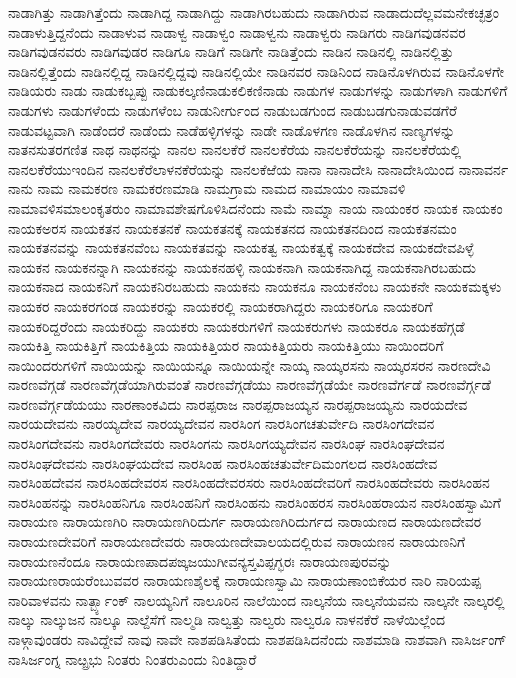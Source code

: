 {ನಾಡಾಗಿತ್ತು
ನಾಡಾಗಿತ್ತೆಂದು
ನಾಡಾಗಿದ್ದ
ನಾಡಾಗಿದ್ದು
ನಾಡಾಗಿರಬಹುದು
ನಾಡಾಗಿರುವ
ನಾಡಾದುದೆಲ್ಲವಮನೇಕಚ್ಛತ್ರಂ
ನಾಡಾಳುತ್ತಿದ್ದನೆಂದು
ನಾಡಾಳುವ
ನಾಡಾಳ್ವ
ನಾಡಾಳ್ವಂ
ನಾಡಾಳ್ವನು
ನಾಡಾಳ್ವರು
ನಾಡಿಗರು
ನಾಡಿಗವುಡನವರ
ನಾಡಿಗವುಡನವರು
ನಾಡಿಗವುಡರ
ನಾಡಿಗೂ
ನಾಡಿಗೆ
ನಾಡಿಗೇ
ನಾಡಿತ್ತೆಂದು
ನಾಡಿನ
ನಾಡಿನಲ್ಲಿ
ನಾಡಿನಲ್ಲಿತ್ತು
ನಾಡಿನಲ್ಲಿತ್ತೆಂದು
ನಾಡಿನಲ್ಲಿದ್ದ
ನಾಡಿನಲ್ಲಿದ್ದವು
ನಾಡಿನಲ್ಲಿಯೇ
ನಾಡಿನವರ
ನಾಡಿನಿಂದ
ನಾಡಿನೊಳಗಿರುವ
ನಾಡಿನೊಳಗೇ
ನಾಡಿಯರು
ನಾಡು
ನಾಡುಕಬ್ಬಪ್ಪು
ನಾಡುಕಲ್ಕಣಿನಾಡುಕಲಿಕಣಿನಾಡು
ನಾಡುಗಳ
ನಾಡುಗಳನ್ನು
ನಾಡುಗಳಾಗಿ
ನಾಡುಗಳಿಗೆ
ನಾಡುಗಳು
ನಾಡುಗಳೆಂದು
ನಾಡುಗಳೆಂಬ
ನಾಡುನೀರ್ಗುಂದ
ನಾಡುಬಡಗುಂದ
ನಾಡುಬಡಗುನಾಡುವಡಗೆರೆ
ನಾಡುವಟ್ಟವಾಗಿ
ನಾಡೆಂದರೆ
ನಾಡೆಂದು
ನಾಡೆಹಳ್ಳಿಗಳನ್ನು
ನಾಡೇ
ನಾಡೊಳಗಣ
ನಾಡೊಳಗಿನ
ನಾಣ್ಯಗಳನ್ನು
ನಾತನಸುತರಗಣಿತ
ನಾಥ
ನಾಥನನ್ನು
ನಾನಲ
ನಾನಲಕೆರೆ
ನಾನಲಕೆರೆಯ
ನಾನಲಕೆರೆಯನ್ನು
ನಾನಲಕೆರೆಯಲ್ಲಿ
ನಾನಲಕೆರೆಯುಇಂದಿನ
ನಾನಲಕೆರೆಲಾಳನಕೆರೆಯನ್ನು
ನಾನಲಕೆಱೆಯ
ನಾನಾ
ನಾನಾದೇಸಿ
ನಾನಾದೇಸಿಯಿಂದ
ನಾನಾವರ್ನ
ನಾನು
ನಾಮ
ನಾಮಕರಣ
ನಾಮಕರಣಮಾಡಿ
ನಾಮಗ್ರಾಮ
ನಾಮದ
ನಾಮಾಯಂ
ನಾಮಾವಳಿ
ನಾಮಾವಳಿಸಮಾಲಂಕೃತರುಂ
ನಾಮಾವಶೇಷಗೊಳಿಸಿದನೆಂದು
ನಾಮೆ
ನಾಮ್ನಾ
ನಾಯ
ನಾಯಂಕರ
ನಾಯಕ
ನಾಯಕಂ
ನಾಯಕಅರಸ
ನಾಯಕತನ
ನಾಯಕತನಕೆ
ನಾಯಕತನಕ್ಕೆ
ನಾಯಕತನದ
ನಾಯಕತನದಿಂದ
ನಾಯಕತನಮಂ
ನಾಯಕತನವನ್ನು
ನಾಯಕತನವೆಂಬ
ನಾಯಕತವನ್ನು
ನಾಯಕತ್ವ
ನಾಯಕತ್ವಕ್ಕೆ
ನಾಯಕದೇವ
ನಾಯಕದೇವಪಿಳ್ಳೆ
ನಾಯಕನ
ನಾಯಕನನ್ನಾಗಿ
ನಾಯಕನನ್ನು
ನಾಯಕನಹಳ್ಳಿ
ನಾಯಕನಾಗಿ
ನಾಯಕನಾಗಿದ್ದ
ನಾಯಕನಾಗಿರಬಹುದು
ನಾಯಕನಾದ
ನಾಯಕನಿಗೆ
ನಾಯಕನಿರಬಹುದು
ನಾಯಕನು
ನಾಯಕನೂ
ನಾಯಕನೆಂಬ
ನಾಯಕನೇ
ನಾಯಕಮಕ್ಕಳು
ನಾಯಕರ
ನಾಯಕರಗಂಡ
ನಾಯಕರನ್ನು
ನಾಯಕರಲ್ಲಿ
ನಾಯಕರಾಗಿದ್ದರು
ನಾಯಕರಿಗೂ
ನಾಯಕರಿಗೆ
ನಾಯಕರಿದ್ದರೆಂದು
ನಾಯಕರಿದ್ದು
ನಾಯಕರು
ನಾಯಕರುಗಳಿಗೆ
ನಾಯಕರುಗಳು
ನಾಯಕರೂ
ನಾಯಕಹೆಗ್ಗಡೆ
ನಾಯಕಿತ್ತಿ
ನಾಯಕಿತ್ತಿಗೆ
ನಾಯಕಿತ್ತಿಯ
ನಾಯಕಿತ್ತಿಯರ
ನಾಯಕಿತ್ತಿಯರು
ನಾಯಕಿತ್ತಿಯು
ನಾಯಿಂದರಿಗೆ
ನಾಯಿಂದರುಗಳಿಗೆ
ನಾಯಿಯನ್ನು
ನಾಯಿಯನ್ನೂ
ನಾಯಿಯನ್ನೇ
ನಾಯ್ಕ
ನಾಯ್ಕರಸನು
ನಾಯ್ಕರಸರನ
ನಾರಣದೇವಿ
ನಾರಣವೆಗ್ಗಡೆ
ನಾರಣವೆಗ್ಗಡೆಯಾಗಿರುವಂತೆ
ನಾರಣವೆಗ್ಗಡೆಯು
ನಾರಣವೆಗ್ಗಡೆಯೇ
ನಾರಣವೆರ್ಗಡೆ
ನಾರಣವೆರ್ಗ್ಗಡೆ
ನಾರಣವೆರ್ಗ್ಗಡೆಯಯು
ನಾರಣಾಂಕವಿದು
ನಾರಪ್ಪರಾಜ
ನಾರಪ್ಪರಾಜಯ್ಯನ
ನಾರಪ್ಪರಾಜಯ್ಯನು
ನಾರಯದೇವ
ನಾರಯದೇವನು
ನಾರಯ್ಯದೇವ
ನಾರಯ್ಯದೇವನ
ನಾರಸಿಂಗ
ನಾರಸಿಂಗಚತುರ್ವೇದಿ
ನಾರಸಿಂಗದೇವನ
ನಾರಸಿಂಗದೇವನು
ನಾರಸಿಂಗದೇವರು
ನಾರಸಿಂಗನು
ನಾರಸಿಂಗಯ್ಯದೇವನ
ನಾರಸಿಂಘ
ನಾರಸಿಂಘದೇವನ
ನಾರಸಿಂಘದೇವನು
ನಾರಸಿಂಘಯದೇವ
ನಾರಸಿಂಹ
ನಾರಸಿಂಹಚತುರ್ವೇದಿಮಂಗಲದ
ನಾರಸಿಂಹದೇವ
ನಾರಸಿಂಹದೇವನ
ನಾರಸಿಂಹದೇವರಸ
ನಾರಸಿಂಹದೇವರಸರು
ನಾರಸಿಂಹದೇವರಿಗೆ
ನಾರಸಿಂಹದೇವರು
ನಾರಸಿಂಹನ
ನಾರಸಿಂಹನನ್ನು
ನಾರಸಿಂಹನಿಗೂ
ನಾರಸಿಂಹನಿಗೆ
ನಾರಸಿಂಹನು
ನಾರಸಿಂಹರಸ
ನಾರಸಿಂಹರಾಯನ
ನಾರಸಿಂಹಸ್ವಾಮಿಗೆ
ನಾರಾಯಣ
ನಾರಾಯಣಗಿರಿ
ನಾರಾಯಣಗಿರಿದುರ್ಗ
ನಾರಾಯಣಗಿರಿದುರ್ಗದ
ನಾರಾಯಣದ
ನಾರಾಯಣದೇವರ
ನಾರಾಯಣದೇವರಿಗೆ
ನಾರಾಯಣದೇವರು
ನಾರಾಯಣದೇವಾಲಯದಲ್ಲಿರುವ
ನಾರಾಯಣನ
ನಾರಾಯಣನಿಗೆ
ನಾರಾಯಣನೆಂದೂ
ನಾರಾಯಣಪಾದಪಙ್ಕಜಯುಗೀವನ್ಯಸ್ತವಿಪ್ಪಗ್ಭರಃ
ನಾರಾಯಣಪುರವನ್ನು
ನಾರಾಯಣರಾಯರೆಂಬುವವರ
ನಾರಾಯಣಶೈಲಕ್ಕೆ
ನಾರಾಯಣಸ್ವಾಮಿ
ನಾರಾಯಣಾಂಬಿಕೆಯರ
ನಾರಿ
ನಾರಿಯಪ್ಪ
ನಾರಿವಾಳವನು
ನಾರ್ತ್ಬ್ಯಾಂಕ್
ನಾಲಯ್ಯನಿಗೆ
ನಾಲೂರಿನ
ನಾಲೆಯಿಂದ
ನಾಲ್ಕನೆಯ
ನಾಲ್ಕನೆಯವನು
ನಾಲ್ಕನೇ
ನಾಲ್ಕರಲ್ಲಿ
ನಾಲ್ಕು
ನಾಲ್ಕುಜನ
ನಾಲ್ಕೂ
ನಾಲ್ದೆಸೆಗೆ
ನಾಲ್ಮಡಿ
ನಾಲ್ವತ್ತು
ನಾಲ್ವರು
ನಾಲ್ವರೂ
ನಾಳನಕೆರೆ
ನಾಳೆಯಿಲ್ಲೆಂದ
ನಾಳ್ಗಾವುಂಡರು
ನಾವಿದ್ದೇವೆ
ನಾವು
ನಾವೇ
ನಾಶಪಡಿಸಿತೆಂದು
ನಾಶಪಡಿಸಿದನೆಂದು
ನಾಶಮಾಡಿ
ನಾಶವಾಗಿ
ನಾಸಿರ್ಜಂಗ್
ನಾಸಿರ್ಜಂಗ್ನ
ನಾೞ್ಪ್ರಭು
ನಿಂತರು
ನಿಂತರುಎಂದು
ನಿಂತಿದ್ದಾರೆ
}
